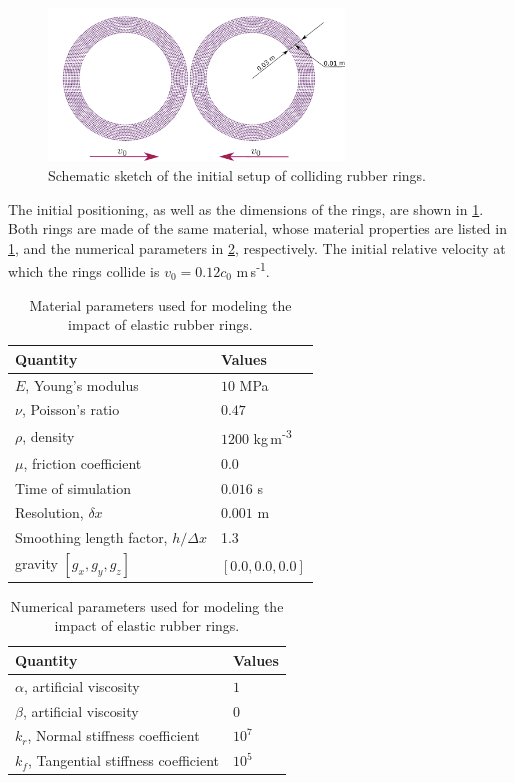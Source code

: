 \begin{figure}[!htpb]
  \centering
  \includegraphics[width=0.7\textwidth]{images/csph/images/yan_2021_colliding_rubber_rings/schematic}
  \caption{Schematic sketch of the initial setup of colliding rubber rings.}
\label{fig:colliding_rings}
\end{figure}
The initial positioning, as well as the dimensions of the rings, are shown in
\cref{fig:colliding_rings}. Both rings are made of the same material, whose
material properties are listed in \cref{tab:colliding-rings-material-params},
and the numerical parameters in \cref{tab:colliding-rings-numerical-params},
respectively. The initial relative velocity at which the rings collide is
$v_0 = 0.12 c_0$ m\,s\textsuperscript{-1}.

\begin{table}[!ht]
  \centering
  \begin{tabular}[!ht]{ll}
    \toprule
    Quantity & Values\\
    \midrule
    $E$, Young's modulus & $10$ MPa \\
    $\nu$, Poisson's ratio & $0.47$ \\
    $\rho$, density & $1200$ kg\,m\textsuperscript{-3} \\
    $\mu$, friction coefficient & $0.0$ \\
    Time of simulation & $0.016$ s \\
    Resolution, $\delta x$ & $0.001$ m\\
    Smoothing length factor, $h/\Delta x$ & 1.3\\
    gravity $[g_x, g_y, g_z]$ & $[0.0, 0.0, 0.0]$\\
    \bottomrule
  \end{tabular}
  \caption{Material parameters used for modeling the impact of elastic rubber rings.}%
  \label{tab:colliding-rings-material-params}
\end{table}

\begin{table}[!ht]
  \centering
  \begin{tabular}[!ht]{ll}
    \toprule
    Quantity & Values\\
    \midrule
    $\alpha$, artificial viscosity & $1$ \\
    $\beta$, artificial viscosity & $0$ \\
    $k_r$, Normal stiffness coefficient & $10^{7}$ \\
    $k_f$, Tangential stiffness coefficient & $10^{5}$ \\
    \bottomrule
  \end{tabular}
  \caption{Numerical parameters used for modeling the impact of elastic rubber rings.}%
  \label{tab:colliding-rings-numerical-params}
\end{table}

